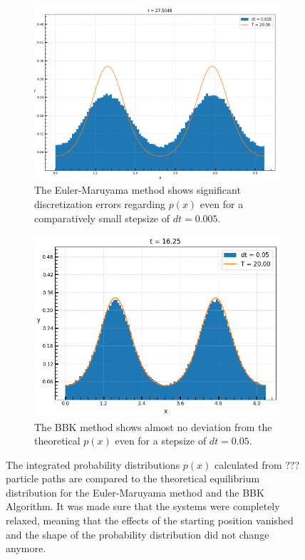 	\begin{figure}[htp]
		\begin{subfigure}{0.5\textwidth}
			\centering
			\includegraphics[width=0.8\linewidth]{graphics/Distribution-Euler-0.005.png}
			\caption{The Euler-Maruyama method shows significant discretization errors regarding $p(x)$ even for a comparatively small stepsize of $dt =	0.005$.}
		\end{subfigure}
		\begin{subfigure}{0.5\textwidth}
			\centering
			\includegraphics[width=0.8\linewidth]{graphics/Distribution-BBK-0.05.png}
			\caption{The BBK method shows almost no deviation from the theoretical $p(x)$ even for a stepsize of $dt =	0.05$.}
		\end{subfigure}
		\caption{The integrated probability distributions $p(x)$ calculated from ??? particle paths are compared to the theoretical equilibrium distribution for the Euler-Maruyama method and the BBK Algorithm. It was made sure that the systems were completely relaxed, meaning that the effects of the starting position vanished and the shape of the probability distribution did not change anymore.}
		\label{Fig::Cos-Prob-Dist}
	\end{figure}
	
